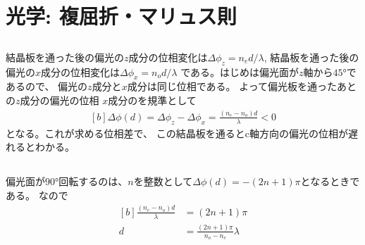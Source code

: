 \documentclass[../../master.tex]{subfiles}
\begin{document}
\chapter{光学: 複屈折・マリュス則}
\section{}
結晶板を通った後の偏光の\(z\)成分の位相変化は\(\Delta\phi_z=n_ed/\lambda\),
結晶板を通った後の偏光の\(x\)成分の位相変化は\(\Delta\phi_x=n_od/\lambda\)
である。はじめは偏光面が\(z\)軸から\(\ang{45}\)であるので、
偏光の\(z\)成分と\(x\)成分は同じ位相である。
よって偏光板を通ったあとの\(z\)成分の偏光の位相
\(x\)成分のを規準として
\begin{equation}\begin{aligned}[b]
    \Delta\phi(d)=\Delta\phi_z -\Delta\phi_x = \frac{(n_e-n_o)d}{\lambda}<0
\end{aligned}\end{equation}
となる。これが求める位相差で、
この結晶板を通るとc軸方向の偏光の位相が遅れるとわかる。

\section{}
偏光面が\(\ang{90}\)回転するのは、\(n\)を整数として\(\Delta\phi(d)= -(2n+1)\pi\)となるときである。
なので
\begin{equation}\begin{aligned}[b]
    \frac{(n_e-n_o)d}{\lambda} &= (2n+1)\pi\\
    d &=\frac{(2n+1)\pi}{n_o-n_e}\lambda
\end{aligned}\end{equation}
\end{document}
